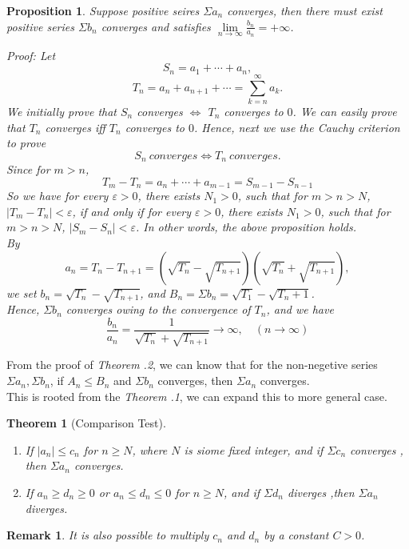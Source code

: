 \documentclass[12pt]{article}
\theoremstyle{oneline}
\newtheorem{theorem}{Theorem}[subsection]
\newtheorem{remark}{Remark}[subsection]
\newtheorem{proposition}{Proposition}[subsection]
\theoremstyle{twoline}
\begin{document}
\begin{proposition}
  Suppose positive seires $\Sigma a_n$ converges, then there must exist positive series $\Sigma b_n$ converges and satisfies $\lim\limits_{n\to\infty}\frac{b_n}{a_n}=+\infty$.

\textit{Proof:} Let 
\[S_n=a_1+\cdots+a_n,\]
\[T_n=a_n+a_{n+1}+\cdots=\sum\limits_{k=n}^\infty a_k.\]
We initially prove that $S_n$ converges $\iff$ $T_n$ converges to $0$. We can easily prove that $T_n$ converges iff $T_n$ converges to $0$. Hence, next we use the Cauchy criterion to prove
\[S_n ~converges \iff T_n~ converges.\]
Since for $m>n$,
\[T_m-T_n=a_n+\cdots+a_{m-1}=S_{m-1}-S_{n-1}\]
So we have for every $\varepsilon>0$, there exists $N_1>0$, such that for $m>n>N$, $|T_m-T_n|<\varepsilon$, if and only if for every $\varepsilon>0$, there exists $N_1>0$, such that for $m>n>N$, $|S_m-S_n|<\varepsilon$.
In other words, the above proposition holds.\\
By
\[a_n=T_n-T_{n+1}=(\sqrt{T_n}-\sqrt{T_{n+1}})(\sqrt{T_n}+\sqrt{T_{n+1}}),\]
we set $b_n=\sqrt{T_n}-\sqrt{T_{n+1}}$, and $B_n=\Sigma b_n=\sqrt{T_1}-\sqrt{T_n+1}$.\\
Hence, $\Sigma b_n$ converges owing to the convergence of $T_n$, and we have 
\[\frac{b_n}{a_n}=\frac1{\sqrt{T_n}+\sqrt{T_{n+1}}}\to \infty,\quad (n\to \infty)\]
\end{proposition}

\introduction
\hspace*{2em}
From the proof of \textit{Theorem \thesubsection.2}, we can know that for the non-negetive series $\Sigma a_n, \Sigma b_n$, if $A_n\leq B_n$ and $\Sigma b_n$ converges, then $\Sigma a_n$ converges.\\
\hspace*{2em}
This is rooted from the \textit{Theorem \thesubsection.1}, we can expand this to more general case.

\begin{theorem}[Comparison Test]
  \begin{enumerate}
    \item If $|a_n|\leq c_n$ for $n\geq N$, where $N$ is siome fixed integer, and if $\Sigma c_n$ converges , then $\Sigma a_n$ converges.
    \item If $a_n \geq d_n\geq 0$ or $a_n \leq d_n\leq0$ for $n\geq N$, and if $\Sigma d_n$ diverges ,then $\Sigma a_n$ diverges.
  \end{enumerate}
\end{theorem}

\begin{remark}
  It is also possible to multiply $c_n$ and $d_n$ by a constant $C>0$.
\end{remark}
\end{document}
